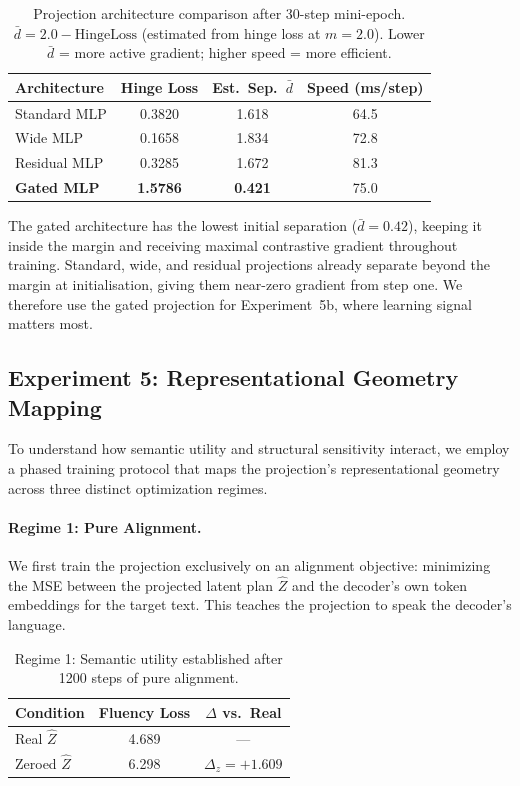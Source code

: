 \documentclass[11pt]{article}
\begin{document}
\begin{table}[h]
\centering
\caption{Projection architecture comparison after 30-step mini-epoch.
  $\bar{d} = 2.0 - \text{HingeLoss}$ (estimated from hinge loss at $m{=}2.0$).
  Lower $\bar{d}$ = more active gradient; higher speed = more efficient.}
\label{tab:exp4}
\begin{tabular}{lccc}
\toprule
\textbf{Architecture} & \textbf{Hinge Loss} & \textbf{Est.\ Sep.\ $\bar{d}$} & \textbf{Speed (ms/step)} \\
\midrule
Standard MLP & 0.3820 & 1.618 & 64.5 \\
Wide MLP & 0.1658 & 1.834 & 72.8 \\
Residual MLP & 0.3285 & 1.672 & 81.3 \\
\textbf{Gated MLP} & \textbf{1.5786} & \textbf{0.421} & 75.0 \\
\bottomrule
\end{tabular}
\end{table}

The gated architecture has the lowest initial separation ($\bar{d} = 0.42$),
keeping it inside the margin and receiving maximal contrastive gradient
throughout training.
Standard, wide, and residual projections already separate beyond the margin
at initialisation, giving them near-zero gradient from step one.
We therefore use the gated projection for Experiment~5b,
where learning signal matters most.

\subsection{Experiment 5: Representational Geometry Mapping}
\label{sec:exp5}

To understand how semantic utility and structural sensitivity interact, we employ a phased training protocol that maps the projection's representational geometry across three distinct optimization regimes.

\paragraph{Regime 1: Pure Alignment.}
We first train the projection exclusively on an alignment objective: minimizing the MSE between the projected latent plan $\hat{Z}$ and the decoder's own token embeddings for the target text. This teaches the projection to speak the decoder's language.

\begin{table}[h]
\centering
\caption{Regime 1: Semantic utility established after 1200 steps of pure alignment.}
\label{tab:exp5_alignment}
\begin{tabular}{lcc}
\toprule
\textbf{Condition} & \textbf{Fluency Loss} & \textbf{$\Delta$ vs.\ Real} \\
\midrule
Real $\hat{Z}$ & 4.689 & — \\
Zeroed $\hat{Z}$ & 6.298 & $\Delta_z = +1.609$ \\
\bottomrule
\end{tabular}
\end{table}
\end{document}
